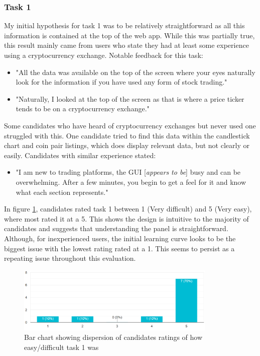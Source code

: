 \subsubsection{Task 1}
\label{sec:evaluation:ui:tasks:q1}
\noindent My initial hypothesis for task 1 was to be relatively straightforward as all this information is contained at the top of the web app. While this was partially true, this result mainly came from users who state they had at least some experience using a cryptocurrency exchange. Notable feedback for this task:
\begin{itemize}
\item "All the data was available on the top of the screen where your eyes naturally look for the information if you have used any form of stock trading."
\item  "Naturally, I looked at the top of the screen as that is where a price ticker tends to be on a cryptocurrency exchange."
\end{itemize}

\noindent Some candidates who have heard of cryptocurrency exchanges but never used one struggled with this. One candidate tried to find this data within the candlestick chart and coin pair listings, which does display relevant data, but not clearly or easily. Candidates with similar experience  stated:
\begin{itemize}
\item "I am new to trading platforms, the GUI [\textit{appears to be}] busy and can be overwhelming. After a few minutes, you begin to get a feel for it and know what each section represents." 
\end{itemize}


\noindent In figure \ref{fig:eval:web_app:task1_was_it_easy}, candidates rated task 1 between 1 (Very difficult) and 5 (Very easy), where most rated it at a 5. This shows the design is intuitive to the majority of candidates and suggests that understanding the panel is straightforward. Although, for inexperienced users, the initial learning curve looks to be the biggest issue with the lowest rating rated at a 1. This seems to persist as a repeating issue throughout this evaluation.

  \begin{figure}[ht]
  \centering
 \includegraphics[width=0.85\textwidth]{content/graphics/task1_was_it_easy.PNG}
  \caption{Bar chart showing dispersion of candidates ratings of how easy/difficult task 1 was}
  \label{fig:eval:web_app:task1_was_it_easy}
\end{figure}

